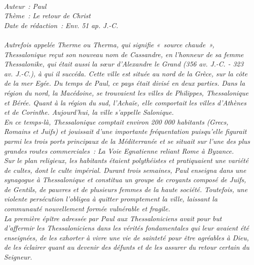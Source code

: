 \BFont
\noindent\hrulefill
{\footnotesize
\textit{
\bigskip
{\centering{}
\\Auteur~: Paul
\\Thème~: Le retour de Christ
\\Date de rédaction~: Env. 51 ap. J.-C.\\}
}
\textit{
\\Autrefois appelée Therme ou Therma, qui signifie «~source chaude~», Thessalonique reçut son nouveau nom de Cassandre, en l'honneur de sa femme Thessalonike, qui était aussi la sœur d'Alexandre le Grand (356 av. J.-C. - 323 av. J.-C.), à qui il succéda. Cette ville est située au nord de la Grèce, sur la côte de la mer Egée. Du temps de Paul, ce pays était divisé en deux parties. Dans la région du nord, la Macédoine, se trouvaient les villes de Philippes, Thessalonique et Bérée. Quant à la région du sud, l'Achaïe, elle comportait les villes d'Athènes et de Corinthe. Aujourd'hui, la ville s'appelle Salonique.
\\En ce temps-là, Thessalonique comptait environ 200 000 habitants (Grecs, Romains et Juifs) et jouissait d'une importante fréquentation puisqu'elle figurait parmi les trois ports principaux de la Méditerranée et se situait sur l'une des plus grandes routes commerciales~: La Voie Egnatienne reliant Rome à Byzance.
\\Sur le plan religieux, les habitants étaient polythéistes et pratiquaient une variété de cultes, dont le culte impérial. Durant trois semaines, Paul enseigna dans une synagogue à Thessalonique et constitua un groupe de croyants composé de Juifs, de Gentils, de pauvres et de plusieurs femmes de la haute société. Toutefois, une violente persécution l'obligea à quitter promptement la ville, laissant la communauté nouvellement formée vulnérable et fragile.
\\La première épître adressée par Paul aux Thessaloniciens avait pour but d'affermir les Thessaloniciens dans les vérités fondamentales qui leur avaient été enseignées, de les exhorter à vivre une vie de sainteté pour être agréables à Dieu, de les éclairer quant au devenir des défunts et de les assurer du retour certain du Seigneur.\bigskip
}
}
\par\nobreak\noindent\hrulefill
